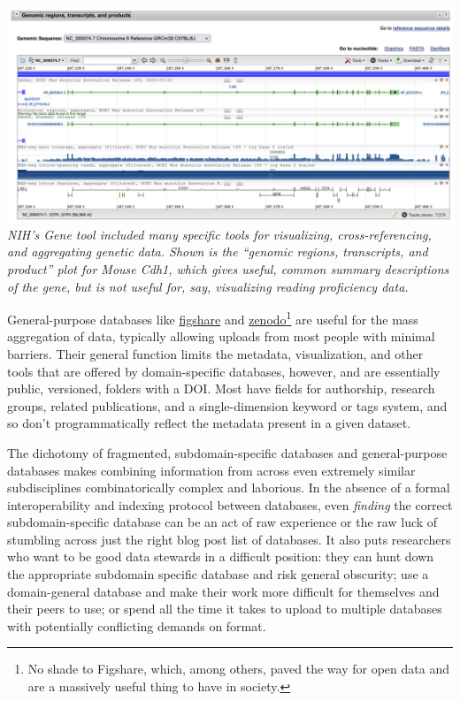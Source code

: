\documentclass[10pt]{article}
\begin{document}
\begin{multicols}{2}
\includegraphics[width=\linewidth]{../assets/images/nih_gene_cdh1.png}
\emph{NIH's Gene tool included many specific tools for visualizing,
cross-referencing, and aggregating genetic data. Shown is the ``genomic
regions, transcripts, and product'' plot for Mouse Cdh1, which gives
useful, common summary descriptions of the gene, but is not useful for,
say, visualizing reading proficiency data.}

General-purpose databases like \href{https://figshare.com/}{figshare}
and \href{https://zenodo.org/}{zenodo}\footnote{No shade to Figshare,
  which, among others, paved the way for open data and are a massively
  useful thing to have in society.} are useful for the mass aggregation
of data, typically allowing uploads from most people with minimal
barriers. Their general function limits the metadata, visualization, and
other tools that are offered by domain-specific databases, however, and
are essentially public, versioned, folders with a DOI. Most have fields
for authorship, research groups, related publications, and a
single-dimension keyword or tags system, and so don't programmatically
reflect the metadata present in a given dataset.

The dichotomy of fragmented, subdomain-specific databases and
general-purpose databases makes combining information from across even
extremely similar subdisciplines combinatorically complex and laborious.
In the absence of a formal interoperability and indexing protocol
between databases, even \emph{finding} the correct subdomain-specific
database can be an act of raw experience or the raw luck of stumbling
across just the right blog post list of databases. It also puts
researchers who want to be good data stewards in a difficult position:
they can hunt down the appropriate subdomain specific database and risk
general obscurity; use a domain-general database and make their work
more difficult for themselves and their peers to use; or spend all the
time it takes to upload to multiple databases with potentially
conflicting demands on format.


\end{multicols}
\end{document}
